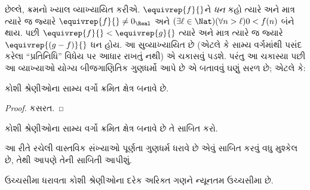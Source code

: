 છેલ્લે, ક્રમનો ખ્યાલ વ્યાખ્યાયિત કરીએ. $\equivrep{f}{}$ને
\emph{ધન} કહો ત્યારે અને માત્ર ત્યારે જ જ્યારે $\equivrep{f}{}\neq
0_\Real$ અને $(\exists \ell \in \Nat)(\forall n > \ell)0 < f(n)$
બંને થાય. પછી $\equivrep{f}{} < \equivrep{g}{}$ ત્યારે અને માત્ર
ત્યારે જ જ્યારે $\equivrep{(g - f)}{}$ ધન હોય. આ સુવ્યાખ્યાયિત છે
(એટલે કે સામ્ય વર્ગમાંથી પસંદ કરેલા ``પ્રતિનિધિ'' વિધેય પર આધાર
રાખતું નથી) એ ચકાસવું પડશે.
પરંતુ આ ચકાસ્યા પછી આ વ્યાખ્યાઓ યોગ્ય બીજગાણિતિક ગુણધર્મો આપે છે
એ બતાવવું ઘણું સરળ છે; એટલે કે:
\begin{thm}
કોશી શ્રેણીઓના સામ્ય વર્ગો ક્રમિત ક્ષેત્ર બનાવે છે.
\end{thm}

\begin{proof}
કસરત.
\end{proof}

\begin{prob}
કોશી શ્રેણીઓના સામ્ય વર્ગો ક્રમિત ક્ષેત્ર બનાવે છે તે સાબિત કરો.
\end{prob}

આ રીતે રચેલી વાસ્તવિક સંખ્યાઓ પૂર્ણતા ગુણધર્મ ધરાવે છે એવું સાબિત
કરવું વધુ મુશ્કેલ છે, તેથી આપણે તેની સાબિતી આપીશું.

\begin{thm}
ઉચ્ચસીમા ધરાવતા કોશી શ્રેણીઓના દરેક અરિક્ત ગણને ન્યૂનતમ ઉચ્ચસીમા છે.
\end{thm}


